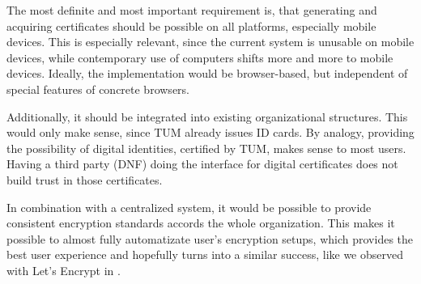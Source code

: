 The most definite and most important requirement is, that generating and acquiring certificates should be possible on
all platforms, especially mobile devices.
This is especially relevant, since the current system is unusable on mobile devices, while contemporary use of computers
shifts more and more to mobile devices.
Ideally, the implementation would be browser-based, but independent of special features of concrete browsers.

Additionally, it should be integrated into existing organizational structures.
This would only make sense, since TUM already issues ID cards.
By analogy, providing the possibility of digital identities, certified by TUM, makes sense to most users.
Having a third party (DNF) doing the interface for digital certificates does not build trust in those certificates.

In combination with a centralized system, it would be possible to provide consistent encryption standards accords the
whole organization.
This makes it possible to almost fully automatizate user's encryption setups, which provides the best user experience and
hopefully turns into a similar success, like we observed with Let's Encrypt in .
